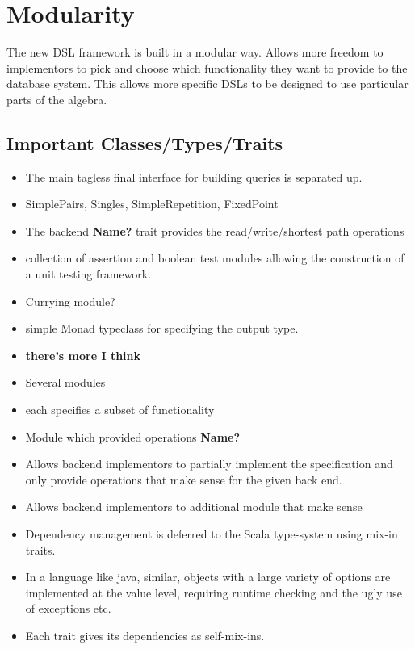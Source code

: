 \documentclass{report}
\newcommand \2[0]{\textbf{2}}
\newcommand \3[0]{\textbf{3}}
\newcommand{\todo}[1]{\textbf{#1}}
\begin{document}
\section{Modularity}
The new DSL framework is built in a modular way. 
Allows more freedom to implementors to pick and choose which functionality they want to provide to the database system. This allows more specific DSLs to be designed to use particular parts of the algebra.
\subsection{Important Classes/Types/Traits}
\begin{itemize}
    \item The main tagless final interface for building queries is separated up.
    \item SimplePairs, Singles, SimpleRepetition, FixedPoint
    \item The backend \todo{Name?} trait provides the read/write/shortest path operations
    \item collection of assertion and boolean test modules allowing the construction of a unit testing framework.
    \item Currying module?
    \item simple Monad  typeclass for specifying the output type.
    \item \todo{there's more  I think}
\end{itemize}

\begin{itemize}
\item Several modules
\item each specifies a subset of functionality

\item Module which provided operations \todo{Name?}
\item Allows backend implementors to partially implement the specification and only provide operations that make sense for the given back end.
\item Allows backend implementors to additional module that make sense
\item Dependency management is deferred to the Scala type-system using mix-in traits.
\item In a language like java, similar, objects with a large variety of options are implemented at the value level, requiring runtime checking and the ugly use of exceptions etc.
\item Each trait gives its dependencies as self-mix-ins.
\end{itemize}
\end{document}
